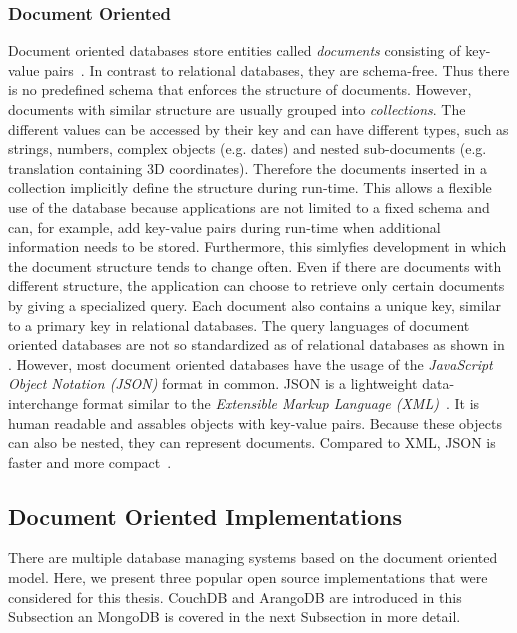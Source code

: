 \subsubsection{Document Oriented}
\label{sec:documene-design}
Document oriented databases store entities called \emph{documents}
consisting of key-value
pairs~\cite{mongodb,document-comparison,document-description}. In
contrast to relational databases, they are schema-free. Thus there is
no predefined schema that enforces the structure of
documents. However, documents with similar structure are usually
grouped into \emph{collections}. The different values can be accessed
by their key and can have different types, such as strings, numbers,
complex objects (e.g. dates) and nested sub-documents
(e.g. translation containing 3D coordinates). Therefore the documents
inserted in a collection implicitly define the structure during
run-time. This allows a flexible use of the database because
applications are not limited to a fixed schema and can, for example,
add key-value pairs during run-time when additional information needs
to be stored. Furthermore, this simlyfies development in which the
document structure tends to change often. Even if there are documents
with different structure, the application can choose to retrieve only
certain documents by giving a specialized query. Each document also
contains a unique key, similar to a primary key in relational
databases. The query languages of document oriented databases are not
so standardized as of relational databases as shown in
. However, most document oriented databases
have the usage of the \emph{JavaScript Object Notation (JSON)} format
in common. JSON is a lightweight data-interchange format similar to
the \emph{Extensible Markup Language (XML)}~\cite{json}. It is human
readable and assables objects with key-value pairs. Because these
objects can also be nested, they can represent documents. Compared to
XML, JSON is faster and more compact~\cite{json-comparison}.


\subsection{Document Oriented Implementations}
\label{sec:documentdbs}
There are multiple database managing systems based on the document
oriented model. Here, we present three popular open source
implementations that were considered for this thesis. CouchDB and
ArangoDB are introduced in this Subsection an MongoDB is covered in
the next Subsection in more detail.

